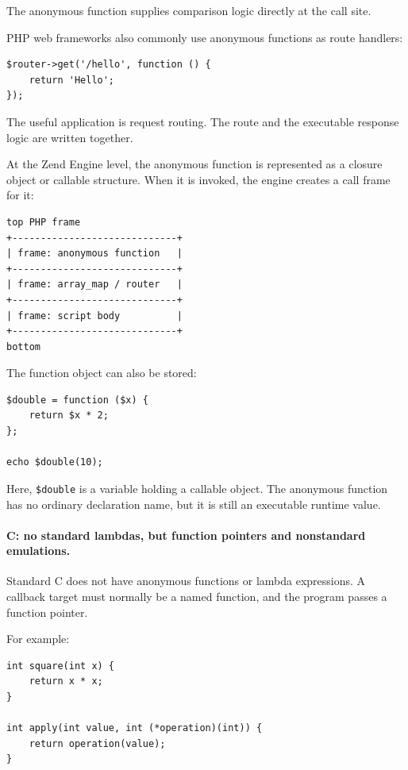 The anonymous function supplies comparison logic directly at the call site.

PHP web frameworks also commonly use anonymous functions as route handlers:

\begin{verbatim}
$router->get('/hello', function () {
    return 'Hello';
});
\end{verbatim}

The useful application is request routing. The route and the executable response logic are written together.

At the Zend Engine level, the anonymous function is represented as a closure object or callable structure. When it is invoked, the engine creates a call frame for it:

\begin{verbatim}
top PHP frame
+-----------------------------+
| frame: anonymous function   |
+-----------------------------+
| frame: array_map / router   |
+-----------------------------+
| frame: script body          |
+-----------------------------+
bottom
\end{verbatim}

The function object can also be stored:

\begin{verbatim}
$double = function ($x) {
    return $x * 2;
};

echo $double(10);
\end{verbatim}

Here, \texttt{\$double} is a variable holding a callable object. The anonymous function has no ordinary declaration name, but it is still an executable runtime value.

\paragraph{C: no standard lambdas, but function pointers and nonstandard emulations.}

Standard C does not have anonymous functions or lambda expressions. A callback target must normally be a named function, and the program passes a function pointer.

For example:

\begin{verbatim}
int square(int x) {
    return x * x;
}

int apply(int value, int (*operation)(int)) {
    return operation(value);
}
\end{verbatim}

